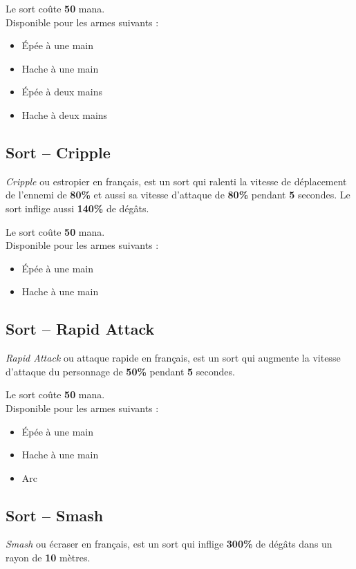 \documentclass[11pt, a4paper, oneside]{report}
\begin{document}
Le sort coûte \textbf{50} mana.\\

Disponible pour les armes suivants :
\begin{multicols}{2}
\begin{itemize}
    \item Épée à une main
    \item Hache à une main
    \item Épée à deux mains
    \item Hache à deux mains
\end{itemize}
\end{multicols}
\subsection{Sort -- Cripple}
\emph{Cripple} ou estropier en français, est un sort qui ralenti la vitesse de déplacement de l'ennemi de \textbf{80\%} et aussi sa vitesse d'attaque de \textbf{80\%} pendant \textbf{5} secondes. Le sort inflige aussi \textbf{140\%} de dégâts.

Le sort coûte \textbf{50} mana.\\

Disponible pour les armes suivants :
\begin{multicols}{2}
\begin{itemize}
    \item Épée à une main
    \item Hache à une main
\end{itemize}
\end{multicols}
\subsection{Sort -- Rapid Attack}
\emph{Rapid Attack} ou attaque rapide en français, est un sort qui augmente la vitesse d'attaque du personnage de \textbf{50\%} pendant \textbf{5} secondes.

Le sort coûte \textbf{50} mana.\\

Disponible pour les armes suivants :
\begin{multicols}{2}
\begin{itemize}
    \item Épée à une main
    \item Hache à une main
    \item Arc
\end{itemize}
\end{multicols}
\subsection{Sort -- Smash}
\emph{Smash} ou écraser en français, est un sort qui inflige \textbf{300\%} de dégâts dans un rayon de \textbf{10} mètres.
\end{document}
